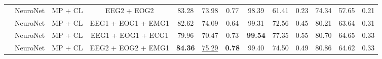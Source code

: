 \begin{table*}[!htbp]
{{\begin{tabular}{c|c|c|c|ccc|ccc|ccc}
                                                                                       & NeuroNet                                                                                          & MP
  + CL                                                                                               & EEG2 + EOG2                         & 83.28          & 73.98          & 0.77                                                                     & 98.39          & 61.41          & 0.23                                                          & 74.34          & 57.65          & 0.21                                                              \\
                                                                                       & NeuroNet                                                                                          & MP
  + CL                                                                                               & EEG1 + EOG1 + EMG1                  & 82.62          & 74.09          & 0.64                                                                     & 99.31          & 72.56          & 0.45                                                          & 80.21          & 63.64          & 0.31                                                              \\
                                                                                       & NeuroNet                                                                                          & MP
  + CL                                                                                               & EEG1 + EOG1 + ECG1                  & 79.96          & 70.47          & 0.73                                                                     & \textbf{99.54} & 77.35          & 0.55                                                          & 80.70          & 64.65          & 0.33                                                              \\
                                                                                       & NeuroNet                                                                                          & MP
  + CL                                                                                               & EEG2 + EOG2 + EMG1                  & \textbf{84.36} & \uline{75.29}  & \textbf{0.78}                                                            & 99.40          & 74.50          & 0.49                                                          & 80.86          & 64.62          & 0.33                                                              \\

\end{tabular}}}
\end{table*}
